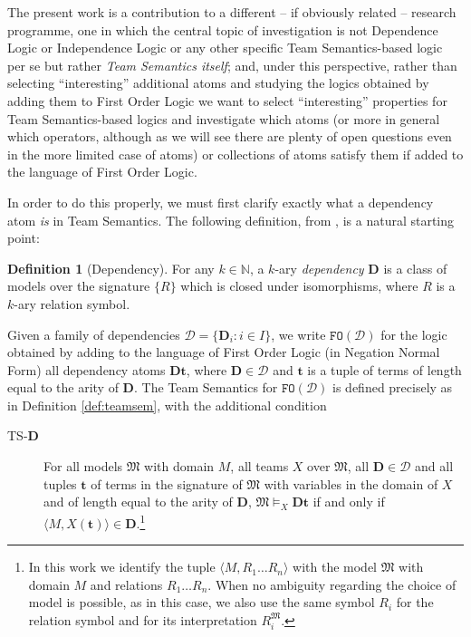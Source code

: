 \documentclass{article}
\theoremstyle{definition}
\newtheorem{Definition}[Theorem]{Definition}
\newcommand{\tuple}{\mathbf}
\newcommand{\FO}{\texttt{FO}}
\newcommand{\M}{\mathfrak M}
\newcommand{\D}{\mathbf D}
\newcommand{\DD}{\mathcal D}
\begin{document}
The present work is a contribution to a different -- if obviously related -- research programme, one in which the central topic of investigation is not Dependence Logic or Independence Logic or any other specific Team Semantics-based logic per se but rather \emph{Team Semantics itself}; and, under this perspective, rather than selecting ``interesting'' additional atoms and studying the logics obtained by adding them to First Order Logic we want to select ``interesting'' properties for Team Semantics-based logics and investigate which atoms (or more in general which operators, although as we will see there are plenty of open questions even in the more limited case of atoms) or collections of atoms satisfy them if added to the language of First Order Logic. 

In order to do this properly, we must first clarify exactly what a dependency atom \emph{is} in Team Semantics. The following definition, from \cite{kuusisto2015}, is a natural starting point: 
\begin{Definition}[Dependency]
For any $k \in \mathbb N$, a $k$-ary \emph{dependency} $\D$ is a class of models over the signature $\{R\}$ which is closed under isomorphisms, where $R$ is a $k$-ary relation symbol. 

	Given a family of dependencies $\DD = \{\D_i : i \in I\}$, we write $\FO(\DD)$ for the logic obtained by adding to the language of First Order Logic (in Negation Normal Form) all dependency atoms $\D \tuple t$, where $\D \in \DD$ and $\tuple t$ is a tuple of terms of length equal to the arity of $\D$. The Team Semantics for $\FO(\DD)$ is defined precisely as in Definition \ref{def:teamsem}, with the additional condition 
\begin{description}
\item[TS-$\D$] For all models $\M$ with domain $M$, all teams $X$ over $\M$, all $\D \in \DD$ and all tuples $\tuple t$ of terms in the signature of $\M$ with variables in the domain of $X$ and of length equal to the arity of $\D$, $\M \models_X \D \tuple t$ if and only if $\langle M, X(\tuple t)\rangle \in \D$.\footnote{In this work we identify the tuple $\langle M, R_1 \ldots R_n\rangle$ with the model $\M$ with domain $M$ and relations $R_1 \ldots R_n$. When no ambiguity regarding the choice of model is possible, as in this case, we also use the same symbol $R_i$ for the relation symbol and for its interpretation $R^\M_i$.}
\end{description}
\label{def:generaldeps}
\end{Definition}
\end{document}
